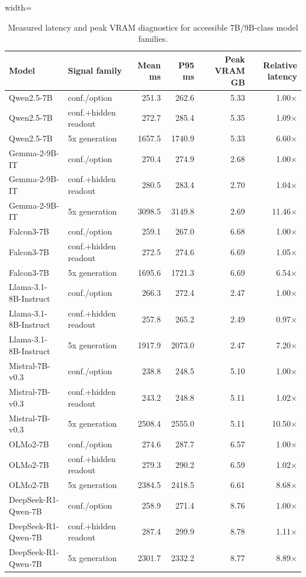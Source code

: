 \begin{table}[t]
\centering
\small
\caption{Measured latency and peak VRAM diagnostics for accessible 7B/9B-class model families.}
\label{tab:latency}
\begin{threeparttable}
\begin{adjustbox}{width=\textwidth}
\begin{tabular}{llrrrr}
\toprule
Model & Signal family & Mean ms & P95 ms & Peak VRAM GB & Relative latency \\
\midrule
Qwen2.5-7B & conf./option & 251.3 & 262.6 & 5.33 & 1.00$\times$ \\
Qwen2.5-7B & conf.+hidden readout & 272.7 & 285.4 & 5.35 & 1.09$\times$ \\
Qwen2.5-7B & 5x generation & 1657.5 & 1740.9 & 5.33 & 6.60$\times$ \\
Gemma-2-9B-IT & conf./option & 270.4 & 274.9 & 2.68 & 1.00$\times$ \\
Gemma-2-9B-IT & conf.+hidden readout & 280.5 & 283.4 & 2.70 & 1.04$\times$ \\
Gemma-2-9B-IT & 5x generation & 3098.5 & 3149.8 & 2.69 & 11.46$\times$ \\
Falcon3-7B & conf./option & 259.1 & 267.0 & 6.68 & 1.00$\times$ \\
Falcon3-7B & conf.+hidden readout & 272.5 & 274.6 & 6.69 & 1.05$\times$ \\
Falcon3-7B & 5x generation & 1695.6 & 1721.3 & 6.69 & 6.54$\times$ \\
Llama-3.1-8B-Instruct & conf./option & 266.3 & 272.4 & 2.47 & 1.00$\times$ \\
Llama-3.1-8B-Instruct & conf.+hidden readout & 257.8 & 265.2 & 2.49 & 0.97$\times$ \\
Llama-3.1-8B-Instruct & 5x generation & 1917.9 & 2073.0 & 2.47 & 7.20$\times$ \\
Mistral-7B-v0.3 & conf./option & 238.8 & 248.5 & 5.10 & 1.00$\times$ \\
Mistral-7B-v0.3 & conf.+hidden readout & 243.2 & 248.8 & 5.11 & 1.02$\times$ \\
Mistral-7B-v0.3 & 5x generation & 2508.4 & 2555.0 & 5.11 & 10.50$\times$ \\
OLMo2-7B & conf./option & 274.6 & 287.7 & 6.57 & 1.00$\times$ \\
OLMo2-7B & conf.+hidden readout & 279.3 & 290.2 & 6.59 & 1.02$\times$ \\
OLMo2-7B & 5x generation & 2384.5 & 2418.5 & 6.61 & 8.68$\times$ \\
DeepSeek-R1-Qwen-7B & conf./option & 258.9 & 271.4 & 8.76 & 1.00$\times$ \\
DeepSeek-R1-Qwen-7B & conf.+hidden readout & 287.4 & 299.9 & 8.78 & 1.11$\times$ \\
DeepSeek-R1-Qwen-7B & 5x generation & 2301.7 & 2332.2 & 8.77 & 8.89$\times$ \\
\bottomrule
\end{tabular}
\end{adjustbox}


\end{threeparttable}
\end{table}

